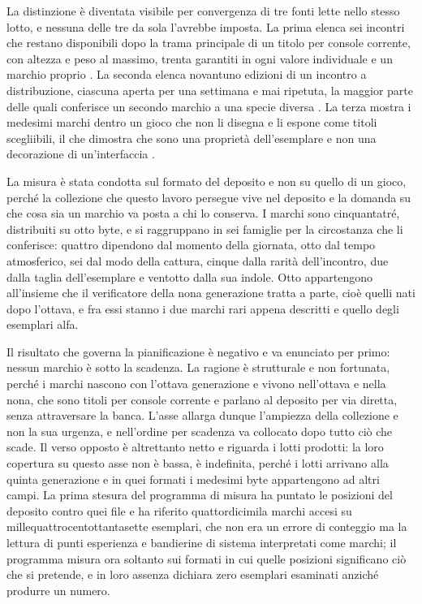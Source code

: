 La distinzione è diventata visibile per convergenza di tre fonti lette nello stesso lotto, e nessuna delle tre da sola l'avrebbe imposta. La prima elenca sei incontri che restano disponibili dopo la trama principale di un titolo per console corrente, con altezza e peso al massimo, trenta garantiti in ogni valore individuale e un marchio proprio \cite{serebii-titan}. La seconda elenca novantuno edizioni di un incontro a distribuzione, ciascuna aperta per una settimana e mai ripetuta, la maggior parte delle quali conferisce un secondo marchio a una specie diversa \cite{serebii-tera-eventi}. La terza mostra i medesimi marchi dentro un gioco che non li disegna e li espone come titoli scegliibili, il che dimostra che sono una proprietà dell'esemplare e non una decorazione di un'interfaccia \cite{serebii-champions-titoli}.

La misura è stata condotta sul formato del deposito e non su quello di un gioco, perché la collezione che questo lavoro persegue vive nel deposito e la domanda su che cosa sia un marchio va posta a chi lo conserva. I marchi sono cinquantatré, distribuiti su otto byte, e si raggruppano in sei famiglie per la circostanza che li conferisce: quattro dipendono dal momento della giornata, otto dal tempo atmosferico, sei dal modo della cattura, cinque dalla rarità dell'incontro, due dalla taglia dell'esemplare e ventotto dalla sua indole. Otto appartengono all'insieme che il verificatore della nona generazione tratta a parte, cioè quelli nati dopo l'ottava, e fra essi stanno i due marchi rari appena descritti e quello degli esemplari alfa.

Il risultato che governa la pianificazione è negativo e va enunciato per primo: nessun marchio è sotto la scadenza. La ragione è strutturale e non fortunata, perché i marchi nascono con l'ottava generazione e vivono nell'ottava e nella nona, che sono titoli per console corrente e parlano al deposito per via diretta, senza attraversare la banca. L'asse allarga dunque l'ampiezza della collezione e non la sua urgenza, e nell'ordine per scadenza va collocato dopo tutto ciò che scade. Il verso opposto è altrettanto netto e riguarda i lotti prodotti: la loro copertura su questo asse non è bassa, è indefinita, perché i lotti arrivano alla quinta generazione e in quei formati i medesimi byte appartengono ad altri campi. La prima stesura del programma di misura ha puntato le posizioni del deposito contro quei file e ha riferito quattordicimila marchi accesi su millequattrocentottantasette esemplari, che non era un errore di conteggio ma la lettura di punti esperienza e bandierine di sistema interpretati come marchi; il programma misura ora soltanto sui formati in cui quelle posizioni significano ciò che si pretende, e in loro assenza dichiara zero esemplari esaminati anziché produrre un numero.

